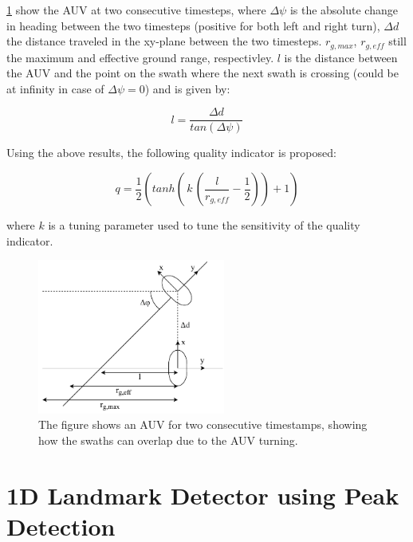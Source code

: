 \cref{fig:quality_ind} show the AUV at two consecutive timesteps, where $\Delta \psi$ is the absolute change in heading between the two timesteps (positive for both left and right turn), $\Delta d$ the distance traveled in the xy-plane between the two timesteps. $r_{g, max}$, $r_{g, eff}$ still the maximum and effective ground range, respectivley. $l$ is the distance between the AUV and the point on the swath where the next swath is crossing (could be at infinity in case of $\Delta \psi = 0$) and is given by:

\begin{equation}
    l = \frac{\Delta d}{tan(\Delta \psi)}
    \label{eq:l_qi}
\end{equation}

Using the above results, the following quality indicator is proposed:

\begin{equation}
    q = \frac{1}{2}(tanh( \,k\, (\frac{l}{r_{g, eff}} - \frac{1}{2})) + 1)
\end{equation}

where $k$ is a tuning parameter used to tune the sensitivity of the quality indicator. 

\begin{figure}
    \centering
    \includegraphics[width=0.55\textwidth]{figures/quality_ind.drawio.pdf}
    \caption{The figure shows an AUV for two consecutive timestamps, showing how the swaths can overlap due to the AUV turning.}
    \label{fig:quality_ind}
\end{figure}

\section{1D Landmark Detector using Peak Detection}

